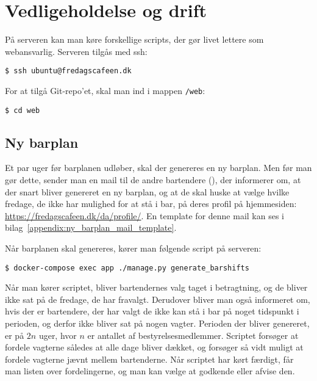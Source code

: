 \section{Vedligeholdelse og drift}
\label{sec:vedligeholdelse-og-drift}

På serveren kan man køre forskellige scripts, der gør livet lettere som webansvarlig.
Serveren tilgås med ssh:

\begin{verbatim}
$ ssh ubuntu@fredagscafeen.dk
\end{verbatim}

For at tilgå Git-repo'et, skal man ind i mappen \texttt{/web}:

\begin{verbatim}
$ cd web
\end{verbatim}

\subsection{Ny barplan}
\label{sec:ny-barplan}

Et par uger før barplanen udløber, skal der genereres en ny barplan.
Men før man gør dette, sender man en mail til de andre bartendere (), 
der informerer om, at der snart bliver genereret en ny barplan, og at de skal huske at vælge hvilke 
fredage, de ikke har mulighed for at stå i bar, på deres profil på hjemmesiden: 
\url{https://fredagscafeen.dk/da/profile/}. 
En template for denne mail kan ses i bilag~\ref{appendix:ny_barplan_mail_template}.

Når barplanen skal genereres, kører man følgende script på serveren:

\begin{verbatim}
$ docker-compose exec app ./manage.py generate_barshifts
\end{verbatim}

Når man kører scriptet, bliver bartendernes valg taget i betragtning, og de bliver ikke sat på de
fredage, de har fravalgt. Derudover bliver man også informeret om, hvis der er bartendere, der har
valgt de ikke kan stå i bar på noget tidspunkt i perioden, og derfor ikke bliver sat på nogen vagter.
Perioden der bliver genereret, er på $2n$ uger, hvor $n$ er antallet af bestyrelsesmedlemmer.
Scriptet forsøger at fordele vagterne således at alle dage bliver dækket, og forsøger så vidt muligt
at fordele vagterne jævnt mellem bartenderne.
Når scriptet har kørt færdigt, får man listen over fordelingerne, og man kan vælge at godkende eller
afvise den.

